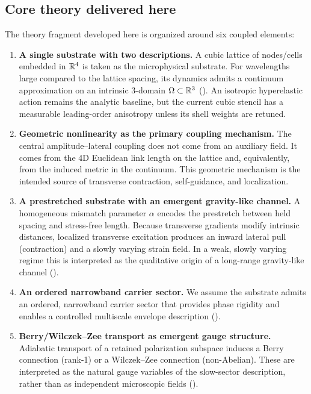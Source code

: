 \subsection{Core theory delivered here}
The theory fragment developed here is organized around six coupled elements:
\begin{enumerate}
\item \textbf{A single substrate with two descriptions.}
A cubic lattice of nodes/cells embedded in $\mathbb{R}^4$ is taken as the microphysical substrate.
For wavelengths large compared to the lattice spacing, its dynamics admits a continuum approximation on an intrinsic
$3$-domain $\Omega\subset\mathbb{R}^3$ (). An isotropic hyperelastic action remains the analytic
baseline, but the current cubic stencil has a measurable leading-order anisotropy unless its shell weights are retuned.

\item \textbf{Geometric nonlinearity as the primary coupling mechanism.}
The central amplitude--lateral coupling does not come from an auxiliary field.
It comes from the 4D Euclidean link length on the lattice and, equivalently, from the induced metric in the continuum.
This geometric mechanism is the intended source of transverse contraction, self-guidance, and localization.

\item \textbf{A prestretched substrate with an emergent gravity-like channel.}
A homogeneous mismatch parameter $\alpha$ encodes the prestretch between held spacing and stress-free length.
Because transverse gradients modify intrinsic distances, localized transverse excitation produces an inward lateral pull
(contraction) and a slowly varying strain field.
In a weak, slowly varying regime this is interpreted as the qualitative origin of a long-range gravity-like channel
().

\item \textbf{An ordered narrowband carrier sector.}
We assume the substrate admits an ordered, narrowband carrier sector that provides phase rigidity and enables a
controlled multiscale envelope description ().

\item \textbf{Berry/Wilczek--Zee transport as emergent gauge structure.}
Adiabatic transport of a retained polarization subspace induces a Berry connection (rank-1) or a Wilczek--Zee
connection (non-Abelian).
These are interpreted as the natural gauge variables of the slow-sector description, rather than as independent
microscopic fields ().


\end{enumerate}
